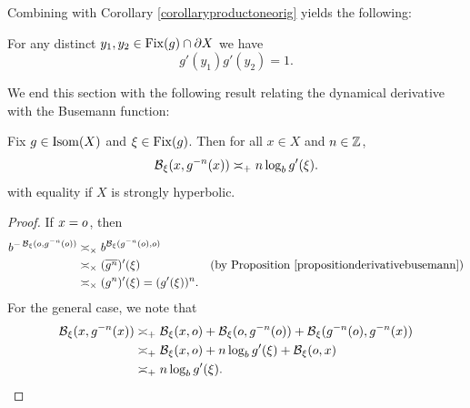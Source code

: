 Combining with Corollary \ref{corollaryproductoneorig} yields the following:

\begin{corollary}
\label{corollaryproductone}
For any distinct $y_1,y_2\in\operatorname{Fix}(g)\cap\partial X$ we have
\[
g'(y_1) g'(y_2) = 1.
\]
\end{corollary}




We end this section with the following result relating the dynamical derivative with the Busemann function:

\begin{proposition}
\label{propositionbusemannpreserved}
Fix $g\in\operatorname{Isom}(X)$ and $\xi\in\operatorname{Fix}(g)$. Then for all $x\in X$ and $n\in\Z$,
\[
\operatorname{\mathcal B}_\xi(x , g^{-n}(x)) \asymp_+ n\log_b g'(\xi).
\]
with equality if $X$ is strongly hyperbolic.
\end{proposition}
\begin{proof}
If $x = o$, then
\begin{align*}
b^{-\operatorname{\mathcal B}_\xi(o , g^{-n}(o))}
&\asymp_\times b^{\operatorname{\mathcal B}_\xi(g^{-n}(o),o)}\\
&\asymp_\times (\overline{g^n})'(\xi) & \textup{(by Proposition \ref{propositionderivativebusemann})}\\
&\asymp_\times (g^n)'(\xi) = (g'(\xi))^n.
\end{align*}
For the general case, we note that
\begin{align*}
\operatorname{\mathcal B}_\xi(x , g^{-n}(x))
&\asymp_+ \operatorname{\mathcal B}_\xi(x,o) + \operatorname{\mathcal B}_\xi(o , g^{-n}(o)) + \operatorname{\mathcal B}_\xi(g^{-n}(o), g^{-n}(x))\\
&\asymp_+ \operatorname{\mathcal B}_\xi(x,o) + n\log_b g'(\xi) + \operatorname{\mathcal B}_\xi(o,x)\\
&\asymp_+ n\log_b g'(\xi).
\end{align*}
\end{proof}



